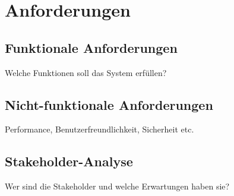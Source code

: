 \chapter{Anforderungen}\label{Chap:Anforderungen}

\section{Funktionale Anforderungen}
Welche Funktionen soll das System erfüllen?
\section{Nicht-funktionale Anforderungen}
Performance, Benutzerfreundlichkeit, Sicherheit etc.

\section{Stakeholder-Analyse}
Wer sind die Stakeholder und welche Erwartungen haben sie?